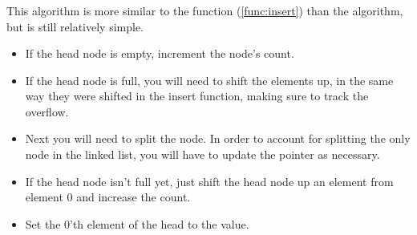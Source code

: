 \pagebreak
\subsubsection{}
This algorithm is more similar to the  function (\ref{func:insert}) than the 
algorithm, but is still relatively simple.

\begin{itemize}
	\item If the head node is empty, increment the node's count.
	\item If the head node is full, you will need to shift the elements up, in the
	      same way they were shifted in the insert function, making sure to track the overflow.
	\item Next you will need to split the node.
	      In order to account for splitting the only node in the linked list, you
	      will have to update the  pointer as necessary.
	\item If the head node isn't full yet, just shift the head node up an element
	      from element 0 and increase the count.
	\item Set the 0'th element of the head to the value.
\end{itemize}
